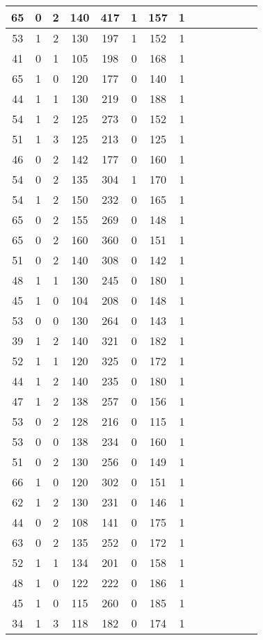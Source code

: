 \documentclass{article}
\begin{document}
\begin{longtable}{|c|c|c|c|c|c|c|c|c|c|c|c|c|c|}
\hline
65 & 0 & 2 & 140 & 417 & 1 & 157 & 1\\
\hline
53 & 1 & 2 & 130 & 197 & 1 & 152 & 1\\
\hline
41 & 0 & 1 & 105 & 198 & 0 & 168 & 1\\
\hline
65 & 1 & 0 & 120 & 177 & 0 & 140 & 1\\
\hline
44 & 1 & 1 & 130 & 219 & 0 & 188 & 1\\
\hline
54 & 1 & 2 & 125 & 273 & 0 & 152 & 1\\
\hline
51 & 1 & 3 & 125 & 213 & 0 & 125 & 1\\
\hline
46 & 0 & 2 & 142 & 177 & 0 & 160 & 1\\
\hline
54 & 0 & 2 & 135 & 304 & 1 & 170 & 1\\
\hline
54 & 1 & 2 & 150 & 232 & 0 & 165 & 1\\
\hline
65 & 0 & 2 & 155 & 269 & 0 & 148 & 1\\
\hline
65 & 0 & 2 & 160 & 360 & 0 & 151 & 1\\
\hline
51 & 0 & 2 & 140 & 308 & 0 & 142 & 1\\
\hline
48 & 1 & 1 & 130 & 245 & 0 & 180 & 1\\
\hline
45 & 1 & 0 & 104 & 208 & 0 & 148 & 1\\
\hline
53 & 0 & 0 & 130 & 264 & 0 & 143 & 1\\
\hline
39 & 1 & 2 & 140 & 321 & 0 & 182 & 1\\
\hline
52 & 1 & 1 & 120 & 325 & 0 & 172 & 1\\
\hline
44 & 1 & 2 & 140 & 235 & 0 & 180 & 1\\
\hline
47 & 1 & 2 & 138 & 257 & 0 & 156 & 1\\
\hline
53 & 0 & 2 & 128 & 216 & 0 & 115 & 1\\
\hline
53 & 0 & 0 & 138 & 234 & 0 & 160 & 1\\
\hline
51 & 0 & 2 & 130 & 256 & 0 & 149 & 1\\
\hline
66 & 1 & 0 & 120 & 302 & 0 & 151 & 1\\
\hline
62 & 1 & 2 & 130 & 231 & 0 & 146 & 1\\
\hline
44 & 0 & 2 & 108 & 141 & 0 & 175 & 1\\
\hline
63 & 0 & 2 & 135 & 252 & 0 & 172 & 1\\
\hline
52 & 1 & 1 & 134 & 201 & 0 & 158 & 1\\
\hline
48 & 1 & 0 & 122 & 222 & 0 & 186 & 1\\
\hline
45 & 1 & 0 & 115 & 260 & 0 & 185 & 1\\
\hline
34 & 1 & 3 & 118 & 182 & 0 & 174 & 1\\

\end{longtable}
\end{document}
